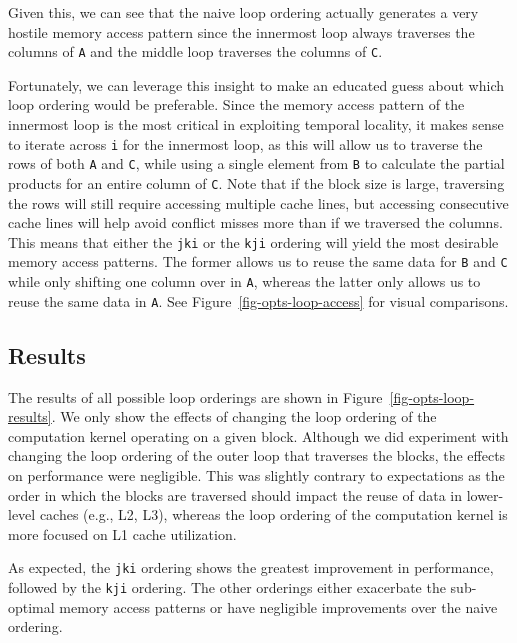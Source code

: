 Given this, we can see that the naive loop ordering actually generates a
very hostile memory access pattern since the innermost loop always
traverses the columns of {\tt{A}} and the middle loop traverses the
columns of {\tt{C}}.
\smallskip

Fortunately, we can leverage this insight to make an educated guess about
which loop ordering would be preferable. Since the memory access pattern
of the innermost loop is the most critical in exploiting temporal
locality, it makes sense to iterate across {\tt{i}} for the innermost
loop, as this will allow us to traverse the rows of both {\tt{A}} and
{\tt{C}}, while using a single element from {\tt{B}} to calculate the
partial products for an entire column of {\tt{C}}. Note that if the block
size is large, traversing the rows will still require accessing multiple
cache lines, but accessing consecutive cache lines will help avoid
conflict misses more than if we traversed the columns. This means that
either the {\tt{jki}} or the {\tt{kji}} ordering will yield the most
desirable memory access patterns. The former allows us to reuse the same
data for {\tt{B}} and {\tt{C}} while only shifting one column over in
{\tt{A}}, whereas the latter only allows us to reuse the same data in
{\tt{A}}. See Figure~\ref{fig-opts-loop-access} for visual comparisons.
\smallskip

\subsection{Results}



The results of all possible loop orderings are shown in
Figure~\ref{fig-opts-loop-results}. We only show the effects of changing
the loop ordering of the computation kernel operating on a given
block. Although we did experiment with changing the loop ordering of the
outer loop that traverses the blocks, the effects on performance were
negligible. This was slightly contrary to expectations as the order in
which the blocks are traversed should impact the reuse of data in
lower-level caches (e.g., L2, L3), whereas the loop ordering of the
computation kernel is more focused on L1 cache utilization.
\smallskip

As expected, the {\tt{jki}} ordering shows the greatest improvement in
performance, followed by the {\tt{kji}} ordering. The other orderings
either exacerbate the sub-optimal memory access patterns or have
negligible improvements over the naive ordering.
\medskip

\clearpage
